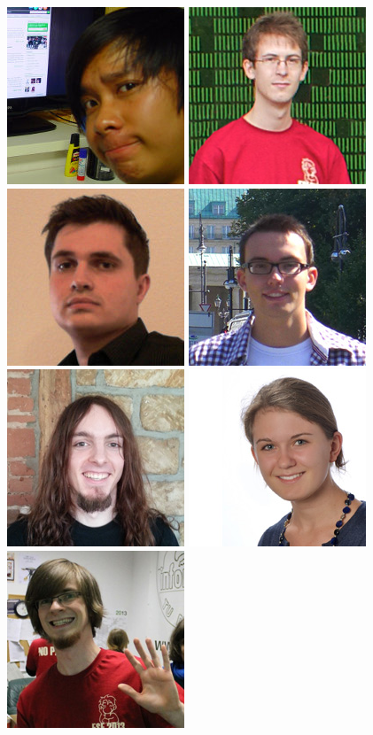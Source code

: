 \includegraphics[width=.2\linewidth]{img/fsr/200_duc_nguyen_tien.jpg}
\includegraphics[width=.2\linewidth]{img/fsr/200_sebastian_mielke.png}
\includegraphics[width=.2\linewidth]{img/fsr/200_rico_skultety.jpg}
\includegraphics[width=.2\linewidth]{img/fsr/200_niklas_fallik.jpg}
\includegraphics[width=.2\linewidth]{img/fsr/200_ben_kosmann.jpg}
\includegraphics[width=.2\linewidth]{img/fsr/200_katja_linnemann.jpg}
\includegraphics[width=.2\linewidth]{img/fsr/200_marc_satkowski.jpg}
